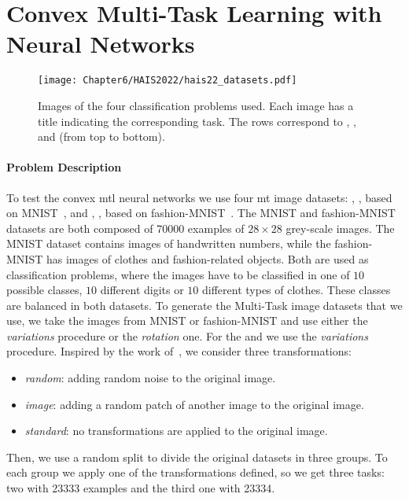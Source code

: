 \section{Convex Multi-Task Learning with Neural Networks}

\begin{figure}[t!]
    \texttt{[image: Chapter6/HAIS2022/hais22\_datasets.pdf]}
    \caption{Images of the four classification problems used. Each image has a title indicating the corresponding task. The rows correspond to , ,  and  (from top to bottom).}
    \label{fig:problems_hais2022}
\end{figure}

\paragraph*{Problem Description\\}
To test the convex \acrshort{mtl} neural networks we use four \acrshort{mt} image datasets:
, , based on MNIST~\citep{LeCunBBH98}, and , , based on fashion-MNIST~\citep{xiao2017}.
%
The MNIST and fashion-MNIST datasets are both composed of \num{70000} examples of $28\times 28$ grey-scale images. The MNIST dataset contains images of handwritten numbers, while the fashion-MNIST has images of clothes and fashion-related objects.
Both are used as classification problems, where the images have to be classified in one of $10$ possible classes, $10$ different digits or $10$ different types of clothes. These classes are balanced in both datasets.
%
To generate the Multi-Task image datasets that we use, we take the images from MNIST or fashion-MNIST and use either the \emph{variations} procedure or the \emph{rotation} one.
%
For the  and  we use the \emph{variations} procedure. Inspired by the work of~\cite{BergstraB12}, we consider three transformations:
\begin{itemize}
    \item \textit{random}: adding random noise to the original image.
    \item \textit{image}: adding a random patch of another image to the original image.
    \item \textit{standard}: no transformations are applied to the original image.
\end{itemize}
Then, we use a random split to divide the original datasets in three groups. To each group we apply one of the transformations defined, so we get three tasks: two with \num{23333} examples and the third one with \num{23334}.

